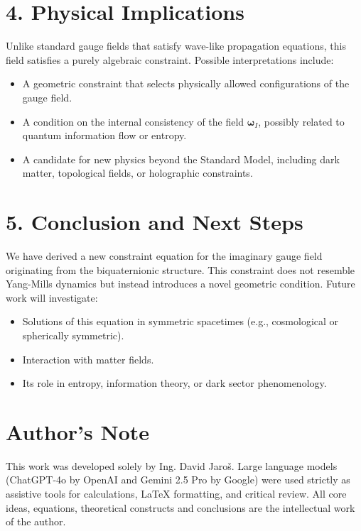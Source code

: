 \documentclass[12pt]{article}
\begin{document}
\section*{4. Physical Implications}

Unlike standard gauge fields that satisfy wave-like propagation equations, this field satisfies a purely algebraic constraint. Possible interpretations include:
\begin{itemize}
  \item A geometric constraint that selects physically allowed configurations of the gauge field.
  \item A condition on the internal consistency of the field \(\boldsymbol{\omega}_I\), possibly related to quantum information flow or entropy.
  \item A candidate for new physics beyond the Standard Model, including dark matter, topological fields, or holographic constraints.
\end{itemize}

\section*{5. Conclusion and Next Steps}

We have derived a new constraint equation for the imaginary gauge field originating from the biquaternionic structure. This constraint does not resemble Yang-Mills dynamics but instead introduces a novel geometric condition. Future work will investigate:
\begin{itemize}
  \item Solutions of this equation in symmetric spacetimes (e.g., cosmological or spherically symmetric).
  \item Interaction with matter fields.
  \item Its role in entropy, information theory, or dark sector phenomenology.
\end{itemize}


\section*{Author's Note}

This work was developed solely by Ing. David Jaroš.  
Large language models (ChatGPT-4o by OpenAI and Gemini 2.5 Pro by Google) were used strictly as assistive tools for calculations, LaTeX formatting, and critical review.  
All core ideas, equations, theoretical constructs and conclusions are the intellectual work of the author.
\end{document}
